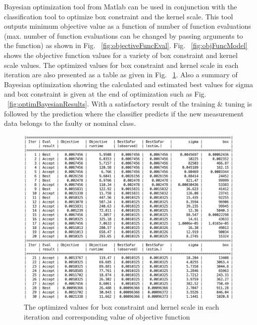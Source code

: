 Bayesian optimization tool from Matlab can be used in conjunction with the classification tool to optimize box constraint and the kernel scale. 
This tool outputs minimum objective value as a function of number of function evaluations (max. number of function evaluations can be changed by passing arguments to the function) as shown in Fig. ~\ref{fig:objectiveFuncEval}. 
Fig. ~\ref{fig:objFuncModel} shows the objective function values for a variety of box constraint and kernel scale values. 
The optimized values for box constraint and kernel scale in each iteration are also presented as a table as given in Fig. ~\ref{fig:optBayesianSteps}. 
Also a summary of Bayesian optimization showing the calculated and estimated best values for sigma and box constraint is given at the end of optimization such as Fig. ~\ref{fig:optimBayesianResults}.
With a satisfactory result of the training \& tuning is followed by the prediction where the classifier predicts if the new measurement data belongs to the faulty or nominal class. 

\begin{figure}
\begin{center}
\includegraphics[width=1.13\textwidth]{figures/optimizationSummaryStuckFault}    %
\caption{The optimized values for box constraint and kernel scale in each iteration and corresponding value of objective function} 
\label{fig:optBayesianSteps}
\end{center}
\end{figure}

